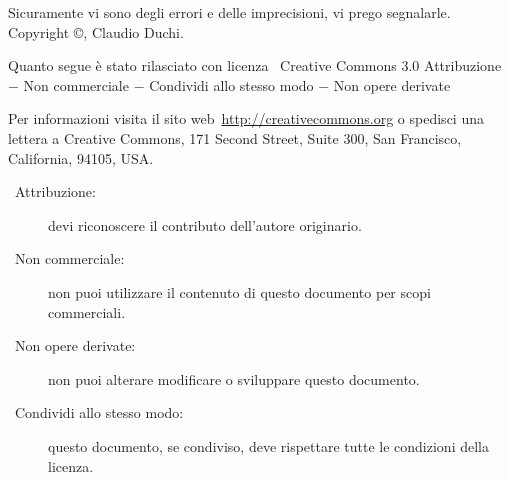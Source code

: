 Sicuramente vi sono degli errori  e delle imprecisioni, vi  prego segnalarle.
\vfill
Copyright \copyright\@ \the\year, Claudio Duchi.

Quanto segue è stato rilasciato con licenza \ccLogo\ Creative Commons   3.0 Attribuzione $-$ Non commerciale $-$ Condividi allo stesso modo $-$ Non opere derivate

Per informazioni visita il sito web\ \url{http://creativecommons.org} o spedisci una lettera a Creative Commons, 171 Second Street, Suite 300, San Francisco, California, 94105, USA.

\begin{description}
\item[\ccAttribution\ Attribuzione:] devi riconoscere il contributo dell'autore originario.
\item [\ccNonCommercial\ Non commerciale:] non puoi utilizzare il contenuto di questo documento per scopi commerciali.
\item [\ccNoDerivatives\ Non opere derivate:]  non puoi alterare modificare o sviluppare questo documento.
\item [\ccShareAlike\ Condividi allo stesso modo:]  questo documento, se condiviso, deve rispettare tutte le condizioni della licenza.
\end{description}

